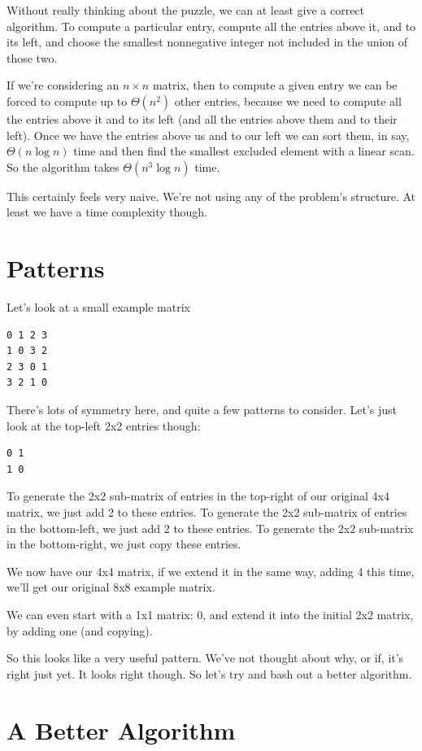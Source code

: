 \documentclass[11pt]{article}
\begin{document}
Without really thinking about the puzzle, we can at least give a correct algorithm. To compute a particular entry, compute all the entries above it, and to its left, and choose the smallest nonnegative integer not included in the union of those two.

If we're considering an $n \times n$ matrix, then to compute a given entry we can be forced to compute up to $\Theta(n^2)$ other entries, because we need to compute all the entries above it and to its left (and all the entries above them and to their left). Once we have the entries above us and to our left we can sort them, in say, $\Theta(n \log n)$ time and then find the smallest excluded element with a linear scan. So the algorithm takes $\Theta(n^3 \log n)$ time.

This certainly feels very naive. We're not using any of the problem's structure. At least we have a time complexity though.
\section{Patterns}

Let's look at a small example matrix
\begin{lstlisting}
0 1 2 3
1 0 3 2
2 3 0 1
3 2 1 0
\end{lstlisting}

There's lots of symmetry here, and quite a few patterns to consider. Let's just look at the top-left 2x2 entries though:
\begin{lstlisting}
0 1
1 0
\end{lstlisting}

To generate the 2x2 sub-matrix of entries in the top-right of our original 4x4 matrix, we just add 2 to these entries. To generate the 2x2 sub-matrix of entries in the bottom-left, we just add 2 to these entries. To generate the 2x2 sub-matrix in the bottom-right, we just copy these entries.

We now have our 4x4 matrix, if we extend it in the same way, adding 4 this time, we'll get our original 8x8 example matrix.

We can even start with a 1x1 matrix: 0, and extend it into the initial 2x2 matrix, by adding one (and copying).

So this looks like a very useful pattern. We've not thought about why, or if, it's right just yet. It looks right though. So let's try and bash out a better algorithm.
\section{A Better Algorithm}
\end{document}
